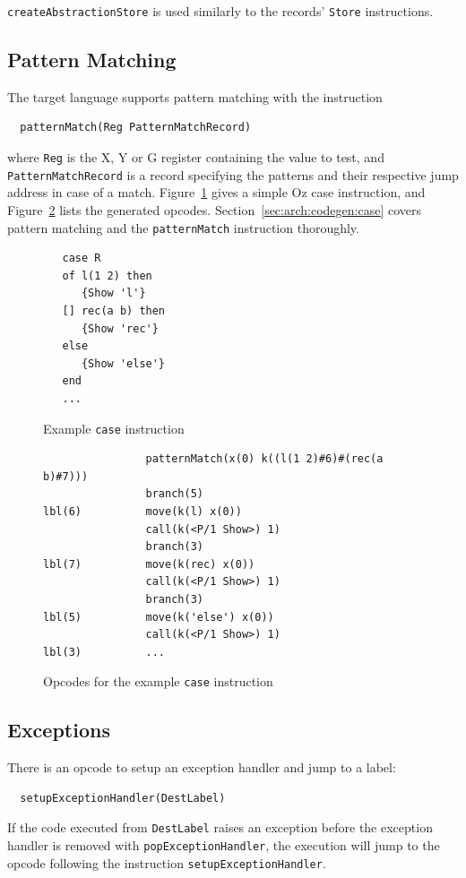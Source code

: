 \documentclass[a4paper]{memoir}
\begin{document}
\lstinline!createAbstractionStore! is used similarly to the records'
\lstinline!Store! instructions.

\subsection{Pattern Matching}
The target language supports pattern matching with the instruction
\begin{lstlisting}
  patternMatch(Reg PatternMatchRecord)
\end{lstlisting}
where \lstinline!Reg! is the X, Y or G register containing the value to test, and
\lstinline!PatternMatchRecord! is a record specifying the patterns and their
respective jump address in case of a match.
Figure~\ref{fig:target:ozcase} gives a simple Oz case instruction, and Figure~\ref{fig:target:case} lists the generated opcodes.
Section~\ref{sec:arch:codegen:case} covers pattern matching and the \lstinline!patternMatch! instruction thoroughly.
 
\begin{figure}[ht]
\begin{lstlisting}
   case R
   of l(1 2) then
      {Show 'l'}
   [] rec(a b) then
      {Show 'rec'}
   else
      {Show 'else'}
   end
   ...
\end{lstlisting}
\caption{Example \lstinline!case! instruction}
\label{fig:target:ozcase}
\end{figure}

\begin{figure}[ht]
\begin{lstlisting}
                patternMatch(x(0) k((l(1 2)#6)#(rec(a b)#7)))
                branch(5)
lbl(6)          move(k(l) x(0))
                call(k(<P/1 Show>) 1)
                branch(3)
lbl(7)          move(k(rec) x(0))
                call(k(<P/1 Show>) 1)
                branch(3)
lbl(5)          move(k('else') x(0))
                call(k(<P/1 Show>) 1)
lbl(3)          ...
\end{lstlisting}
\caption{Opcodes for the example \lstinline!case! instruction}
\label{fig:target:case}
\end{figure}




\subsection{Exceptions}
There is an opcode to setup an exception handler and jump to a label:
\begin{lstlisting}
  setupExceptionHandler(DestLabel)
\end{lstlisting}
If the code executed from \lstinline!DestLabel! raises an exception before  the exception handler
is removed with \lstinline!popExceptionHandler!, the execution will jump to the
opcode following the instruction \lstinline!setupExceptionHandler!.
\end{document}
